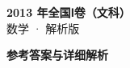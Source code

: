 \documentclass[zihao=-4, a4paper]{ctexart}
\begin{document}
\begin{center}
  {\Large\bfseries 2013 年全国Ⅰ卷（文科）}\\[4pt]
  {\large 数学 · 解析版}
\end{center}
\medskip
{}

\clearpage
{}
\begin{center}{\Large\bfseries 参考答案与详细解析}\end{center}
\medskip

\end{document}
